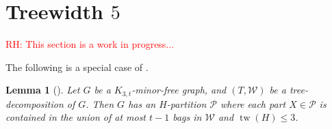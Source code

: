 \documentclass[12pt]{article}
\DeclarePairedDelimiter{\ceil}{\lceil}{\rceil}
\renewcommand{\leq}{\leqslant}
\DeclareMathOperator{\tw}{tw}
\newcommand{\PP}{\mathcal{P}}
\newcommand{\NN}{\mathbb{N}}
\newcommand{\david}[1]{{\color{blue} DW: #1}}
\newcommand{\robert}[1]{\textcolor{red}{RH: #1}}
\theoremstyle{plain}
\newtheorem{lem}[thm]{Lemma}
\theoremstyle{definition}
\begin{document}

\section{Treewidth $5$}
\robert{This section is a work in progress...}


The following is a special case of \citep[Theorem~12]{ISW}. 

\begin{lem}[\cite{ISW}]\label{TdecompPartition}
    Let $G$ be a $K_{3,t}$-minor-free graph, and $(T,\mathcal{W})$ be a tree-decomposition of $G$. Then $G$ has an $H$-partition $\PP$ where each part $X\in \PP$ is contained in the union of at most $t-1$ bags in $\mathcal{W}$ and $\tw(H)\leq 3$.
\end{lem}



\end{document}
